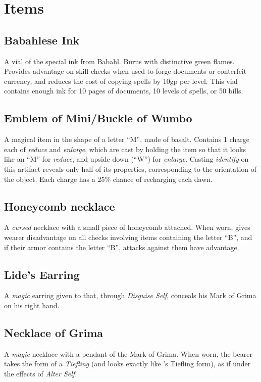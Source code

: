 \section{Items}
\subsection{Babahlese Ink}
\label{items:ink}
A vial of the special ink from Babahl. Burns with distinctive green flames. Provides advantage on skill checks when used to forge documents or conterfeit currency, and reduces the cost of copying spells by 10gp per level. This vial contains enough ink for 10 pages of documents, 10 levels of spells, or 50 bills.

\subsection{Emblem of Mini/Buckle of Wumbo}
\label{items:wumbo}
A magical item in the shape of a letter ``M'', made of basalt. Contains 1 charge each of \textit{reduce} and \textit{enlarge}, which are cast by holding the item so that it looks like an ``M'' for \textit{reduce}, and upside down (``W'') for \textit{enlarge}. Casting \textit{identify} on this artifact reveals only half of its properties, corresponding to the orientation of the object. Each charge has a 25\% chance of recharging each dawn.

\subsection{Honeycomb necklace}
\label{items:honeycomb}
A \textit{cursed} necklace with a small piece of honeycomb attached. When worn, gives wearer disadvantage on all checks involving items containing the letter ``B'', and if their armor contains the letter ``B'', attacks against them have advantage. 


\subsection{Lide's Earring}
\label{items:lideearring}
A \textit{magic} earring given to  that, through \textit{Disguise Self}, conceals his Mark of Grima on his right hand.

\subsection{Necklace of Grima}
\label{items:grimanecklace}
A \textit{magic} necklace with a pendant of the Mark of Grima. When worn, the bearer takes the form of a \textit{Tiefling} (and looks exactly like 's Tiefling form), as if under the effects of \textit{Alter Self}.

